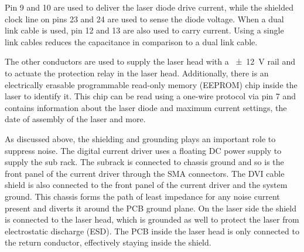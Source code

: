 Pin \num{9} and \num{10} are used to deliver the laser diode drive current, while the shielded clock line on pins \num{23} and \num{24} are used to sense the diode voltage. When a dual link cable is used, pin \num{12} and \num{13} are also used to carry current. Using a single link cables reduces the capacitance in comparison to a dual link cable.

The other conductors are used to supply the laser head with a \qty{\pm 12}{\V} rail and to actuate the protection relay in the laser head. Additionally, there is an  electrically erasable programmable read-only memory (EEPROM) chip inside the laser to identify it. This chip can be read using a one-wire protocol via pin \num{7} and contains information about the laser diode and maximum current settings, the date of assembly of the laser and more.

As discussed above, the shielding and grounding plays an important role to suppress noise. The digital current driver uses a floating DC power supply to supply the sub rack. The subrack is connected to chassis ground and so is the front panel of the current driver through the SMA connectors. The DVI cable shield is also connected to the front panel of the current driver and the system ground. This chassis forms the path of least impedance for any noise current present and diverts it around the PCB ground plane. On the laser side the shield is connected to the laser head, which is grounded as well to protect the laser from electrostatic discharge (ESD). The PCB inside the laser head is only connected to the return conductor, effectively staying inside the shield.

